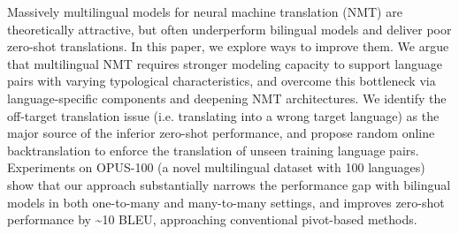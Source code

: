 Massively multilingual models for neural machine translation (NMT) are theoretically attractive, but often underperform bilingual models and deliver poor zero-shot translations. In this paper, we explore ways to improve them.  We argue that multilingual NMT requires stronger modeling capacity to support language pairs with varying typological characteristics, and overcome this bottleneck via language-specific components and deepening NMT architectures. We identify the off-target translation issue (i.e. translating into a wrong target language) as the major source of the inferior zero-shot performance, and propose random online backtranslation to enforce the translation of unseen training language pairs.  Experiments on OPUS-100 (a novel multilingual dataset with 100 languages) show that our approach substantially narrows the performance gap with bilingual models in both one-to-many and many-to-many settings, and improves zero-shot performance by {\textasciitilde}10 BLEU, approaching conventional pivot-based methods.
